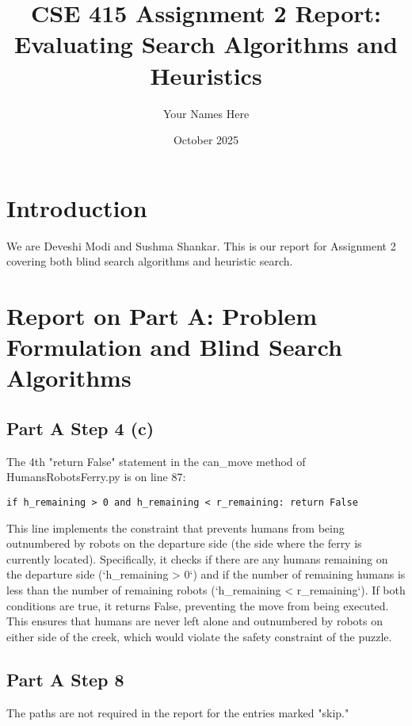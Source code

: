 \documentclass{article}
\title{CSE 415 Assignment 2 Report: \\
Evaluating Search Algorithms and Heuristics}
\author{Your Names Here }
\date{October 2025}
\begin{document}
\maketitle

\section{Introduction}
We are Deveshi Modi and Sushma Shankar.
This is our report for Assignment 2 covering both blind search algorithms
and heuristic search.

\section{Report on Part A: Problem Formulation and Blind Search Algorithms}

\subsection{Part A Step 4 (c)}

The 4th "return False" statement in the can_move method of HumansRobotsFerry.py is on line 87:

\begin{verbatim}
if h_remaining > 0 and h_remaining < r_remaining: return False
\end{verbatim}

This line implements the constraint that prevents humans from being outnumbered by robots on the departure side (the side where the ferry is currently located). Specifically, it checks if there are any humans remaining on the departure side (`h_remaining > 0`) and if the number of remaining humans is less than the number of remaining robots (`h_remaining < r_remaining`). If both conditions are true, it returns False, preventing the move from being executed. This ensures that humans are never left alone and outnumbered by robots on either side of the creek, which would violate the safety constraint of the puzzle.


\subsection{Part A Step 8}

The paths are not required in the report for the entries marked "skip."
\end{document}
